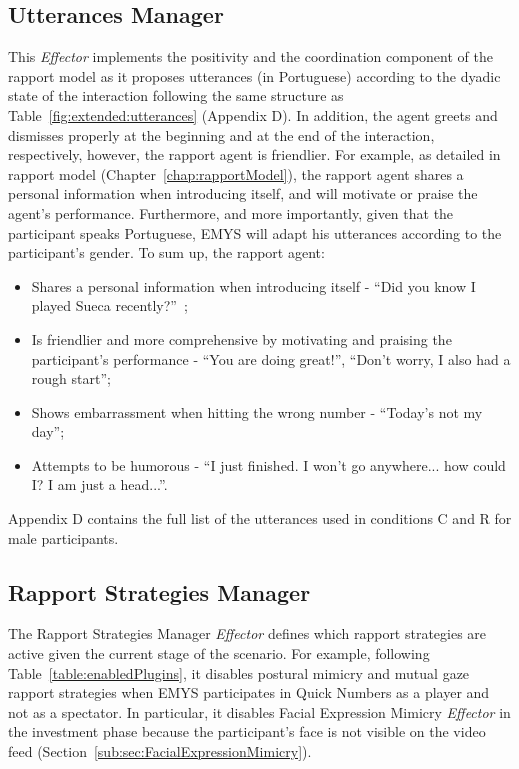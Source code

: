 \subsection{Utterances Manager}

This \textit{Effector} implements the positivity and the coordination component of the rapport model as it proposes utterances (in Portuguese) according to the dyadic state of the interaction following the same structure as Table~\ref{fig:extended:utterances} (Appendix D). In addition, the agent greets and dismisses properly at the beginning and at the end of the interaction, respectively, however, the rapport agent is friendlier. For example, as detailed in rapport model (Chapter~\ref{chap:rapportModel}), the rapport agent shares a personal information when introducing itself, and will motivate or praise the agent's performance. Furthermore, and more importantly, given that the participant speaks Portuguese, \ac{EMYS} will adapt his utterances according to the participant's gender. To sum up, the rapport agent:

\begin{itemize}
	\item Shares a personal information when introducing itself - ``Did you know I played Sueca recently?''~\cite{correia2016trust};
	\item Is friendlier and more comprehensive by motivating and praising the participant's performance - ``You are doing great!'', ``Don't worry, I also had a rough start'';
	\item Shows embarrassment when hitting the wrong number - ``Today's not my day'';
	\item Attempts to be humorous - ``I just finished. I won't go anywhere... how could I? I am just a head...''.
\end{itemize}

Appendix D contains the full list of the utterances used in conditions C and R for male participants.

\subsection{Rapport Strategies Manager}

The Rapport Strategies Manager \textit{Effector} defines which rapport strategies are active given the current stage of the scenario. For example, following Table~\ref{table:enabledPlugins}, it disables postural mimicry and mutual gaze rapport strategies when \ac{EMYS} participates in Quick Numbers as a player and not as a spectator. In particular, it disables Facial Expression Mimicry \textit{Effector} in the investment phase because the participant's face is not visible on the video feed (Section~\ref{sub:sec:FacialExpressionMimicry}).

